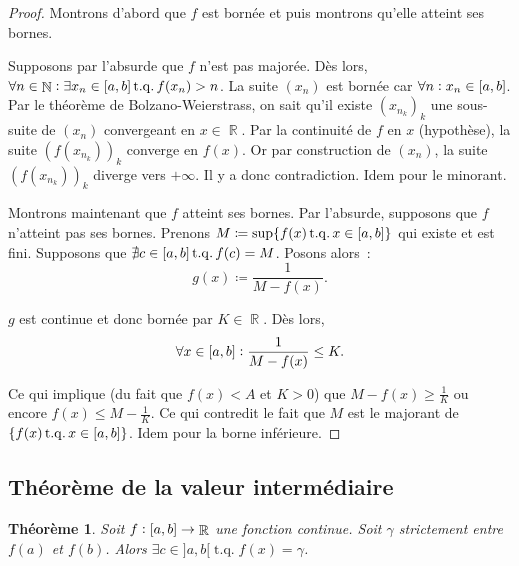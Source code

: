 \documentclass{article}
\DeclareMathOperator{\N}{\mathbb N}
\DeclareMathOperator{\R}{\mathbb R}
\DeclareMathOperator{\tq}{ t.q. }
\newcommand{\ab}{\interval ab}
\newcommand{\fabr}[1]{#1 : \ab \to \R}
\newtheorem{thm}{Théorème}[section]
\theoremstyle{definition}
\theoremstyle{remark}
\begin{document}
		\begin{proof} Montrons d'abord que $f$ est bornée et puis montrons qu'elle atteint ses bornes.

		Supposons par l'absurde que $f$ n'est pas majorée. Dès lors, $\forall n \in \N : \exists x_n \in \ab \tq f(x_n) > n$. La suite $(x_n)$ est bornée car
		$\forall n : x_n \in \ab$. Par le théorème de Bolzano-Weierstrass, on sait qu'il existe $(x_{n_k})_k$ une sous-suite de $(x_n)$ convergeant en
		$x \in \R$. Par la continuité de $f$ en $x$ (hypothèse), la suite $(f(x_{n_k}))_k$ converge en $f(x)$. Or par construction de $(x_n)$, la suite $(f(x_{n_k}))_k$
		diverge vers $+\infty$. Il y a donc contradiction. Idem pour le minorant.

		Montrons maintenant que $f$ atteint ses bornes. Par l'absurde, supposons que $f$ n'atteint pas ses bornes. Prenons
		$M \coloneqq \sup\{f(x) \tq x \in \ab\}$ qui existe et est fini. Supposons que $\nexists c \in \ab \tq f(c) = M$. Posons alors~:
		\[g(x) \coloneqq \frac 1{M - f(x)}.\]

		$g$ est continue et donc bornée par $K \in \R$. Dès lors,
		\[\forall x \in \ab : \frac 1{M-f(x)} \leq K.\]

		Ce qui implique (du fait que $f(x) < A$ et $K > 0$) que $M-f(x) \geq \frac 1K$ ou encore $f(x) \leq M - \frac 1K$. Ce qui contredit le fait que $M$ est le
		majorant de $\{f(x) \tq x \in \ab\}$. Idem pour la borne inférieure. \end{proof}
	
	\subsection{Théorème de la valeur intermédiaire}
		
		\begin{thm} Soit $\fabr f$ une fonction continue. Soit $\gamma$ strictement entre $f(a)$ et $f(b)$.
		Alors $\exists c \in ]a, b[ \tq f(x) = \gamma$. \end{thm}
\end{document}
